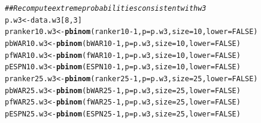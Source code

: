 \documentclass[11pt]{article}\usepackage[]{graphicx}\usepackage[]{color}
\makeatletter
\newcommand{\hlnum}[1]{\textcolor[rgb]{0.686,0.059,0.569}{#1}}%
\newcommand{\hlcom}[1]{\textcolor[rgb]{0.678,0.584,0.686}{\textit{#1}}}%
\newcommand{\hlopt}[1]{\textcolor[rgb]{0,0,0}{#1}}%
\newcommand{\hlstd}[1]{\textcolor[rgb]{0.345,0.345,0.345}{#1}}%
\newcommand{\hlkwb}[1]{\textcolor[rgb]{0.69,0.353,0.396}{#1}}%
\newcommand{\hlkwc}[1]{\textcolor[rgb]{0.333,0.667,0.333}{#1}}%
\newcommand{\hlkwd}[1]{\textcolor[rgb]{0.737,0.353,0.396}{\textbf{#1}}}%
\newenvironment{kframe}{%
 \def\at@end@of@kframe{}%
 \ifinner\ifhmode%
  \def\at@end@of@kframe{\end{minipage}}%
  \begin{minipage}{\columnwidth}%
 \fi\fi%
 \def\FrameCommand##1{\hskip\@totalleftmargin \hskip-\fboxsep
 \colorbox{shadecolor}{##1}\hskip-\fboxsep
     \hskip-\linewidth \hskip-\@totalleftmargin \hskip\columnwidth}%
 \MakeFramed {\advance\hsize-\width
   \@totalleftmargin\z@ \linewidth\hsize
   \@setminipage}}%
 {\par\unskip\endMakeFramed%
 \at@end@of@kframe}
\newenvironment{knitrout}{}{} %
\makeatother
\begin{document}
\begin{knitrout}
\begin{kframe}
\begin{alltt}
\hlcom{## Recompute extreme probabilities consistent with w3}
\hlstd{p.w3} \hlkwb{<-} \hlstd{data.w3[}\hlnum{8}\hlstd{,} \hlnum{3}\hlstd{]}
\hlstd{pranker10.w3} \hlkwb{<-} \hlkwd{pbinom}\hlstd{(ranker10} \hlopt{-} \hlnum{1}\hlstd{,} \hlkwc{p} \hlstd{= p.w3,} \hlkwc{size} \hlstd{=} \hlnum{10}\hlstd{,} \hlkwc{lower} \hlstd{=} \hlnum{FALSE}\hlstd{)}
\hlstd{pbWAR10.w3}   \hlkwb{<-} \hlkwd{pbinom}\hlstd{(bWAR10} \hlopt{-} \hlnum{1}\hlstd{,} \hlkwc{p} \hlstd{= p.w3,} \hlkwc{size} \hlstd{=} \hlnum{10}\hlstd{,} \hlkwc{lower} \hlstd{=} \hlnum{FALSE}\hlstd{)}
\hlstd{pfWAR10.w3}   \hlkwb{<-} \hlkwd{pbinom}\hlstd{(fWAR10} \hlopt{-} \hlnum{1}\hlstd{,} \hlkwc{p} \hlstd{= p.w3,} \hlkwc{size} \hlstd{=} \hlnum{10}\hlstd{,} \hlkwc{lower} \hlstd{=} \hlnum{FALSE}\hlstd{)}
\hlstd{pESPN10.w3}   \hlkwb{<-} \hlkwd{pbinom}\hlstd{(ESPN10} \hlopt{-} \hlnum{1}\hlstd{,} \hlkwc{p} \hlstd{= p.w3,} \hlkwc{size} \hlstd{=} \hlnum{10}\hlstd{,} \hlkwc{lower} \hlstd{=} \hlnum{FALSE}\hlstd{)}
\hlstd{pranker25.w3} \hlkwb{<-} \hlkwd{pbinom}\hlstd{(ranker25} \hlopt{-} \hlnum{1}\hlstd{,} \hlkwc{p} \hlstd{= p.w3,} \hlkwc{size} \hlstd{=} \hlnum{25}\hlstd{,} \hlkwc{lower} \hlstd{=} \hlnum{FALSE}\hlstd{)}
\hlstd{pbWAR25.w3}   \hlkwb{<-} \hlkwd{pbinom}\hlstd{(bWAR25} \hlopt{-} \hlnum{1}\hlstd{,} \hlkwc{p} \hlstd{= p.w3,} \hlkwc{size} \hlstd{=} \hlnum{25}\hlstd{,} \hlkwc{lower} \hlstd{=} \hlnum{FALSE}\hlstd{)}
\hlstd{pfWAR25.w3}   \hlkwb{<-} \hlkwd{pbinom}\hlstd{(fWAR25} \hlopt{-} \hlnum{1}\hlstd{,} \hlkwc{p} \hlstd{= p.w3,} \hlkwc{size} \hlstd{=} \hlnum{25}\hlstd{,} \hlkwc{lower} \hlstd{=} \hlnum{FALSE}\hlstd{)}
\hlstd{pESPN25.w3}   \hlkwb{<-} \hlkwd{pbinom}\hlstd{(ESPN25} \hlopt{-} \hlnum{1}\hlstd{,} \hlkwc{p} \hlstd{= p.w3,} \hlkwc{size} \hlstd{=} \hlnum{25}\hlstd{,} \hlkwc{lower} \hlstd{=} \hlnum{FALSE}\hlstd{)}


\end{alltt}
\end{kframe}
\end{knitrout}
\end{document}
